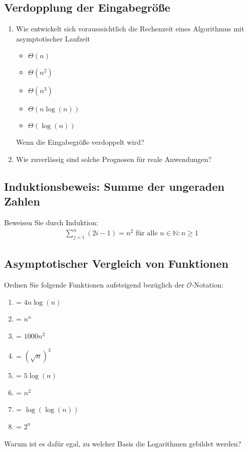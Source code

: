 \documentclass{article}
\begin{document}
\subsection{Verdopplung der Eingabegröße}
\begin{enumerate}[label=\alph*)]
    \item Wie entwickelt sich vorausssichtlich die Rechenzeit eines Algorithmus mit asymptotischer Laufzeit
    \begin{itemize}
        \item $\Theta(n)$
        \item $\Theta(n^2)$
        \item $\Theta(n^3)$
        \item $\Theta(n \log(n))$
        \item $\Theta(\log(n))$
    \end{itemize}
    Wenn die Eingabegröße verdoppelt wird?
    \item Wie zuverlässig sind solche Prognosen für reale Anwendungen?
\end{enumerate}
\subsection{Induktionsbeweis: Summe der ungeraden Zahlen}
Beweisen Sie durch Induktion:
\begin{align*}
    & \sum_{j=1}^{n} (2i-1) = n^2 \text{ für alle } n \in \mathbb{N} : n \geq 1 &
\end{align*}
\subsection{Asymptotischer Vergleich von Funktionen}
Ordnen Sie folgende Funktionen aufsteigend bezüglich der $\mathcal{O}$-Notation:
\begin{enumerate}[label=$f\arabic*$]
    \item = $4n \log(n)$
    \item = $n^n$
    \item = $1000n^2$
    \item = $(\sqrt{n})^3$
    \item = $5 \log(n)$
    \item = $n^2$
    \item = $\log(\log(n))$
    \item = $2^n$
\end{enumerate}
Warum ist es dafür egal, zu welcher Basis die Logarithmen gebildet werden?


\newpage
\end{document}
